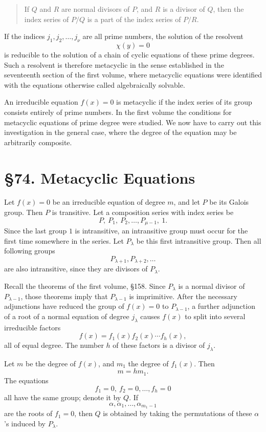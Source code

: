 \documentclass[11pt,a4paper]{book}
\newcommand{\webersection}[2]{\clearpage\section*{\S #1. #2}}
\begin{document}
\begin{quote}
If \(Q\) and \(R\) are normal divisors of \(P\), and \(R\) is a divisor of \(Q\), then the index series of \(P/Q\) is a part of the index series of \(P/R\).
\end{quote}

If the indices \(j_1,j_2,\ldots,j_\nu\) are all prime numbers, the solution of the resolvent
\[
 \chi(y)=0
\]
is reducible to the solution of a chain of cyclic equations of these prime degrees.  Such a resolvent is therefore metacyclic in the sense established in the seventeenth section of the first volume, where metacyclic equations were identified with the equations otherwise called algebraically solvable.

An irreducible equation \(f(x)=0\) is metacyclic if the index series of its group consists entirely of prime numbers.  In the first volume the conditions for metacyclic equations of prime degree were studied.  We now have to carry out this investigation in the general case, where the degree of the equation may be arbitrarily composite.

\webersection{74}{Metacyclic Equations}

Let \(f(x)=0\) be an irreducible equation of degree \(m\), and let \(P\) be its Galois group.  Then \(P\) is transitive.  Let a composition series with index series be
\[
 P,\ P_1,\ P_2,\ldots,P_{\mu-1},\ 1.
\]
Since the last group \(1\) is intransitive, an intransitive group must occur for the first time somewhere in the series.  Let \(P_\lambda\) be this first intransitive group.  Then all following groups
\[
 P_{\lambda+1},P_{\lambda+2},\ldots
\]
are also intransitive, since they are divisors of \(P_\lambda\).

Recall the theorems of the first volume, \S 158.  Since \(P_\lambda\) is a normal divisor of \(P_{\lambda-1}\), those theorems imply that \(P_{\lambda-1}\) is imprimitive.  After the necessary adjunctions have reduced the group of \(f(x)=0\) to \(P_{\lambda-1}\), a further adjunction of a root of a normal equation of degree \(j_\lambda\) causes \(f(x)\) to split into several irreducible factors
\[
 f(x)=f_1(x)f_2(x)\cdots f_h(x),
\]
all of equal degree.  The number \(h\) of these factors is a divisor of \(j_\lambda\).

Let \(m\) be the degree of \(f(x)\), and \(m_1\) the degree of \(f_1(x)\).  Then
\[
 m=hm_1.
\]
The equations
\[
 f_1=0,\ f_2=0,\ldots,f_h=0
\]
all have the same group; denote it by \(Q\).  If
\[
 \alpha,\alpha_1,\ldots,\alpha_{m_1-1}
\]
are the roots of \(f_1=0\), then \(Q\) is obtained by taking the permutations of these \(\alpha\)'s induced by \(P_\lambda\).
\end{document}
